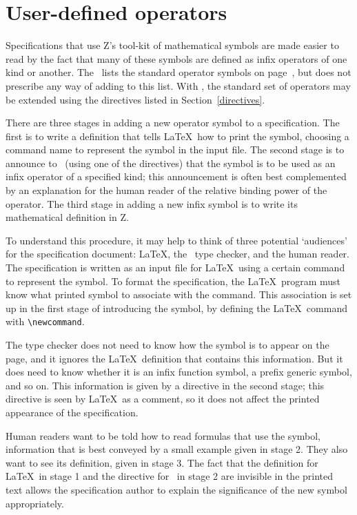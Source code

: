 \section{User-defined operators}\label{userops}

Specifications that use Z's
tool-kit of mathematical symbols are made easier to read by the fact
that many of these symbols are defined as infix operators of one
kind or another.  The \ZRM\ lists the standard operator symbols on
page~\pageref{p:stdsym}, but does not prescribe any way of adding to
this list.  With \fuzz, the standard set of operators may be
extended using the directives listed in Section~\ref{directives}.

There are three stages in adding a new operator symbol to a
specification.  The first is to write a definition that tells
\LaTeX\ how to print the symbol, choosing a command name to
represent the symbol in the input file.  The second stage is to
announce to \fuzz\ (using one of the directives) that the symbol is
to be used as an infix operator of a specified kind; this
announcement is often best complemented by an explanation for the
human reader of the relative binding power of the operator.  The
third stage in adding a new infix symbol is to write its
mathematical definition in Z.

To understand this procedure, it may help to think of three
potential `audiences' for the specification document: \LaTeX, the
\fuzz\ type checker, and the human reader.  The specification is
written as an input file for \LaTeX\, using a certain command to
represent the symbol.  To format the specification, the \LaTeX\
program must know what printed symbol to associate with the
command.  This association is set up in the first stage of
introducing the symbol, by defining the \LaTeX\ command with
\verb/\newcommand/.

The type checker does not need to know how the symbol is to appear
on the page, and it ignores the \LaTeX\ definition that contains
this information.  But it does need to know whether it is an infix
function symbol, a prefix generic symbol, and so on.  This
information is given by a directive in the second stage; this
directive is seen by \LaTeX\ as a comment, so it does not affect the
printed appearance of the specification.

Human readers want to be told how to read formulas that use the
symbol, information that is best conveyed by a small example given
in stage 2.  They also want to see its definition, given in
stage 3.  The fact that the definition for \LaTeX\ in stage 1 and
the directive for \fuzz\ in stage 2 are invisible in the printed
text allows the specification author to explain the significance of
the new symbol appropriately.

